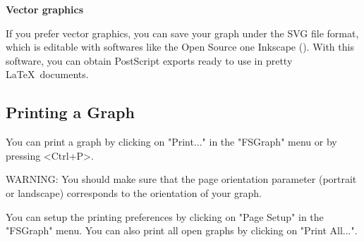 \newpage
\noindent\textbf{Vector graphics}

\bigskip
\noindent If you prefer vector graphics, you can save your graph under the
SVG file format, which is editable with softwares like the Open Source
one Inkscape (\cite{Inkscape}). With this software, you can obtain PostScript
exports ready to use in pretty \LaTeX~documents.

\subsection{Printing a Graph}

You can print a graph by clicking on "Print..." in the "FSGraph" menu or by
pressing <Ctrl+P>.

\bigskip
\noindent WARNING: You should make sure that the page orientation parameter
(portrait or landscape) corresponds  to the orientation of your graph.

\bigskip
\noindent You can setup the printing preferences by clicking on "Page Setup"
in the "FSGraph" menu. You can also print all open graphs by clicking on "Print
All...".


